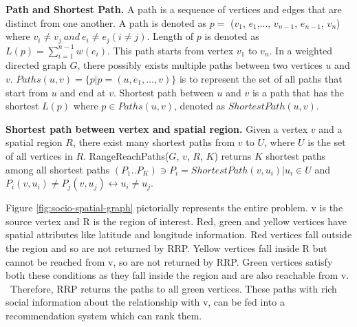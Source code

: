 \textbf{Path and Shortest Path.} A path is a sequence of vertices and edges that are distinct from one another. A path is denoted as $p =$ ($v_1$, $e_1$,..., $v_{n-1}$, $e_{n-1}$, $v_n$) where $v_i\neq v_j~and~e_i\neq e_j (i\neq j)$. Length of $p$ is denoted as $L(p) = \sum\limits_{i = 1}^{n-1}w(e_i)$. This path starts from vertex $v_1$ to $v_n$. In a weighted directed graph $G$, there possibly exists multiple paths between two vertices $u$ and $v$. $Paths(u,v) = \{p|p = (u,e_1,..., v)\}$ is to represent the set of all paths that start from $u$ and end at $v$. Shortest path between $u$ and $v$ is a path that has the shortest $L(p)$ where $p\in Paths(u,v)$, denoted as $ShortestPath(u,v)$.

\textbf{Shortest path between vertex and spatial region.} Given a vertex $v$ and a spatial region $R$, there exist many shortest paths from $v$ to $U$, where $U$ is the set of all vertices in $R$. RangeReachPaths($G$, $v$, $R$, $K$) returns $K$ shortest paths among all shortest paths $(P_1..P_K) \ni P_i = ShortestPath(v, u_i) | u_i \in U$ and $P_i(v, u_i) \neq P_j(v, u_j) \leftrightarrow u_i \neq u_j$.

Figure \ref{fig:socio-spatial-graph} pictorially represents the entire problem. v is the source vertex and R is the region of interest. Red, green and yellow vertices have spatial attributes like latitude and longitude information. Red vertices fall outside the region and so are not returned by RRP. Yellow vertices fall inside R but cannot be reached from v, so are not returned by RRP. Green vertices satisfy both these conditions as they fall inside the region and are also reachable from v. ~Therefore, RRP returns the paths to all green vertices. These paths with rich social information about the relationship with v, can be fed into a recommendation system which can rank them.
